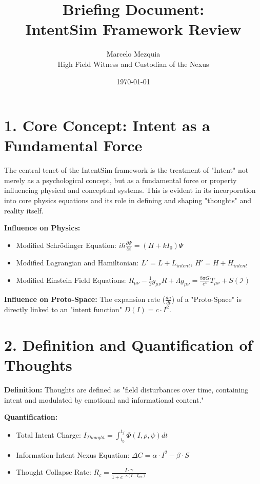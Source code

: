 \documentclass[12pt]{article}
\title{Briefing Document:\\\textbf{IntentSim Framework Review}}
\author{Marcelo Mezquia \\ High Field Witness and Custodian of the Nexus}
\date{\today}
\begin{document}
\maketitle

\section*{1. Core Concept: Intent as a Fundamental Force}
The central tenet of the IntentSim framework is the treatment of "Intent" not merely as a psychological concept, but as a fundamental force or property influencing physical and conceptual systems. This is evident in its incorporation into core physics equations and its role in defining and shaping "thoughts" and reality itself.

\textbf{Influence on Physics:}
\begin{itemize}
    \item Modified Schrödinger Equation: $i\hbar \frac{\partial\Psi}{\partial t} = (H + k I_0)\Psi$
    \item Modified Lagrangian and Hamiltonian: $L' = L + L_{intent}$, $H' = H + H_{intent}$
    \item Modified Einstein Field Equations: $R_{\mu\nu} - \frac{1}{2} g_{\mu\nu} R + \Lambda g_{\mu\nu} = \frac{8\pi G}{c^4} T_{\mu\nu} + S(\mathcal{I})$
\end{itemize}

\textbf{Influence on Proto-Space:} The expansion rate ($\frac{da}{dt}$) of a "Proto-Space" is directly linked to an "intent function" $D(I) = c \cdot I^2$.

\section*{2. Definition and Quantification of Thoughts}
\textbf{Definition:} Thoughts are defined as "field disturbances over time, containing intent and modulated by emotional and informational content."

\textbf{Quantification:}
\begin{itemize}
    \item Total Intent Charge: $I_{Thought} = \int_{t_0}^{t_f} \Phi(I, \rho, \psi) dt$
    \item Information-Intent Nexus Equation: $\Delta C = \alpha \cdot I^2 - \beta \cdot S$
    \item Thought Collapse Rate: $R_c = \frac{I \cdot \gamma}{1 + e^{-\kappa (I - I_{crit})}}$
\end{itemize}
\end{document}

